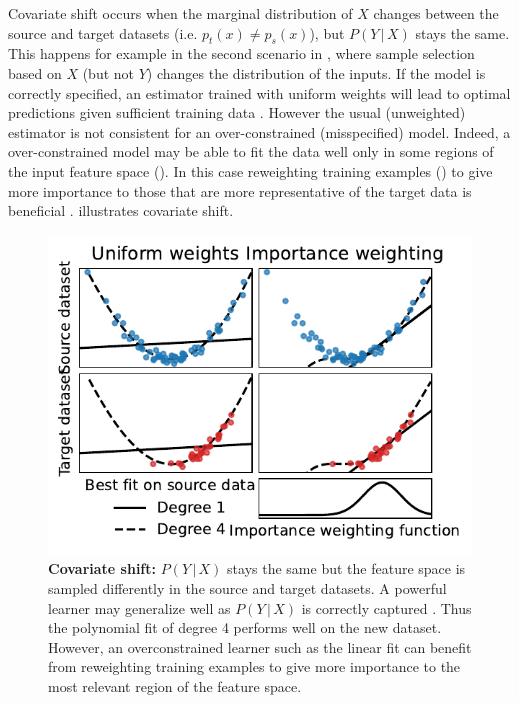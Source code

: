 \documentclass[twocolumn]{article}
\newcommand{\Prob}{ P }
\newcommand{\giv}{ \,|\, }
\begin{document}
Covariate shift occurs when the marginal distribution of \(X\) changes between
the source and target datasets (i.e. \( p_t(x) \neq p_s(x) \)), but \(P(Y \giv X)\) stays the same.
%
This happens for example in the second scenario in
, where sample selection based on \(X\) (but not
\(Y\)) changes the distribution of the inputs.
%
If the model is correctly specified, an estimator trained with uniform weights
will lead to optimal predictions given sufficient training data
\citep[prediction consistency][Lemma 4]{shimodaira2000improving}.
%
However the usual (unweighted) estimator is not consistent for an
over-constrained (misspecified) model.
%
Indeed, a over-constrained model may be able to fit the data well only in some
regions of the input feature space (). In this case reweighting training examples () to give
more importance to those that are more representative of the target data is
beneficial \citep{storkey2009training,scholkopf2012causal}.
%
 illustrates covariate shift.
%
\begin{figure}
\centering
\includegraphics[width=.7\linewidth]{covariate_shift.pdf}
\caption{\label{fig:covariate-shift}\textbf{Covariate shift:} \(\Prob(Y \giv
  X)\) stays the same but the feature space is sampled differently in the source
  and target datasets. A powerful learner may generalize well as \(\Prob(Y \giv
  X)\) is correctly captured \citep{storkey2009training}. Thus the polynomial
  fit of degree 4 performs well on the new dataset. However, an overconstrained
  learner such as the linear fit can benefit from reweighting training examples
  to give more importance to the most relevant region of the feature space.}
\end{figure}
\end{document}
